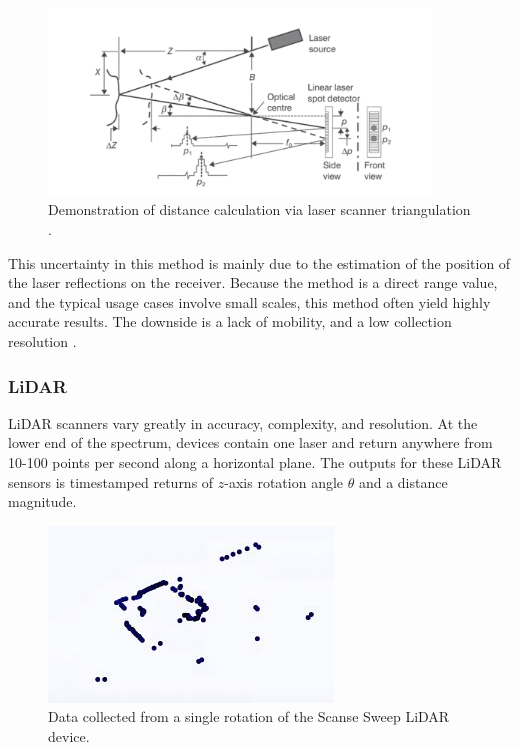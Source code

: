 \documentclass[12pt]{drexelthesis}
\let\Oldsubsubsection\subsubsection
\renewcommand{\subsubsection}{\FloatBarrier\Oldsubsubsection}
\begin{document}
\begin{figure}
	\centering
		\includegraphics[width=4in]{instruments/laser-scanner-triangulation.png}
		\caption[Demonstration of distance calculation via laser scanner triangulation]{Demonstration of distance calculation via laser scanner triangulation 
		\cite{basic-measurement-principles}. }
		\label{laser:triangulation}
\end{figure}

This uncertainty in this method is mainly due to the estimation of the position of the laser reflections on the receiver. Because the method is a direct range value, and the typical usage cases involve small scales, this method often yield highly accurate results. The downside is a lack of mobility, and a low collection resolution \cite{basic-measurement-principles}.




\subsubsection{LiDAR}
LiDAR scanners vary greatly in accuracy, complexity, and resolution. At the lower end of the spectrum, devices contain one laser and return anywhere from 10-100 points per second along a horizontal plane. The outputs for these LiDAR sensors is timestamped returns of $z$-axis rotation angle $\theta$ and a distance magnitude.

\begin{figure}[!ht]
	\centering
		\includegraphics{instruments/crummy_lidar.jpg}
	\caption[Single frame of low tier LiDAR sensor data collection]{\centering Data collected from a single rotation of the Scanse Sweep LiDAR device.}
\end{figure}
\end{document}
